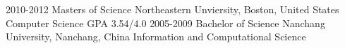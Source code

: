 \documentclass[]{ly-cv} %
\begin{document}
\begin{entrylist}
\entry
{2010-2012}
{Masters of Science} 
{Northeastern Unviersity, Boston, United States}
{Computer Science \hspace{4mm} \footnotesize{GPA 3.54/4.0}}
\entry
{2005-2009}
{Bachelor of Science}
{Nanchang University, Nanchang, China}
{Information and Computational Science}
\end{entrylist}
\end{document}
